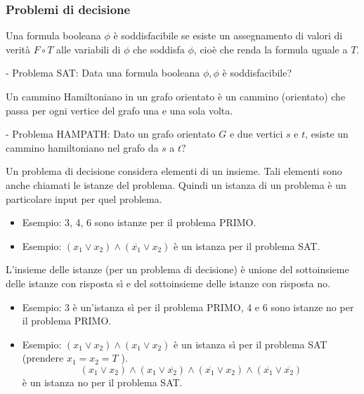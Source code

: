 \subsubsection{Problemi di decisione}

Una formula booleana $\phi$ è soddisfacibile se esiste un assegnamento di valori di verità $F \circ T$ alle variabili di $\phi$ che soddisfa $\phi$, cioè che renda la formula uguale a $T$.

- Problema SAT: Data una formula booleana $\phi, \phi$ è soddisfacibile?

\vspace{5mm}

Un cammino Hamiltoniano in un grafo orientato è un cammino (orientato) che passa per ogni vertice del grafo una e una sola volta.

- Problema HAMPATH: Dato un grafo orientato $G$ e due vertici $s$ e $t$, esiste un cammino hamiltoniano nel grafo da $s$ a $t ?$

\vspace{5mm}

Un problema di decisione considera elementi di un insieme. Tali elementi sono anche chiamati le istanze del problema.
Quindi un istanza di un problema è un particolare input per quel problema.
\begin{itemize}
    \item Esempio: 3, 4, 6 sono istanze per il problema PRIMO.
    \item Esempio: $\left(x_{1} \vee x_{2}\right) \wedge\left(\overline{x_{1}} \vee x_{2}\right)$ è un istanza per il problema SAT.
\end{itemize}

L'insieme delle istanze (per un problema di decisione) è unione del sottoinsieme delle istanze con risposta sì e del sottoinsieme delle istanze con risposta no.
\begin{itemize}
    \item Esempio: 3 è un'istanza sì per il problema PRIMO, 4 e 6 sono istanze no per il problema PRIMO.
    \item Esempio: $\left(x_{1} \vee x_{2}\right) \wedge\left(x_{1} \vee x_{2}\right)$ è un istanza sì per il problema SAT (prendere $x_{1}=x_{2}=T$ ).
$$
\left(x_{1} \vee x_{2}\right) \wedge\left(x_{1} \vee \overline{x_{2}}\right) \wedge\left(\overline{x_{1}} \vee x_{2}\right) \wedge\left(\overline{x_{1}} \vee \overline{x_{2}}\right)
$$
è un istanza no per il problema SAT.
\end{itemize}

